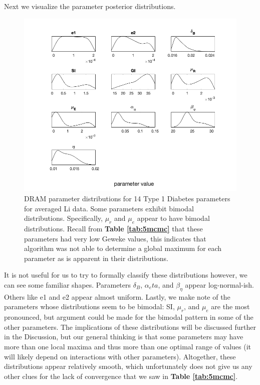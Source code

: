 \documentclass{article}
\begin{document}
\par Next we visualize the parameter posterior distributions.
\begin{figure}[H]
    \centering
    \includegraphics[width=15cm]{MCMC_figs/dram_t1d_final/jul10_avg_run1(noIC)_acute_NOD_waveOn_lietal_den.png}
    \caption{DRAM parameter distributions for 14 Type 1 Diabetes parameters for averaged Li data. Some parameters exhibit bimodal distributions. Specifically, $\mu_r$ and $\mu_e$ appear to have bimodal distributions. Recall from \textbf{Table \ref{tab:5mcmc}} that these parameters had very low Geweke values, this indicates that algorithm was not able to determine a global maximum for each parameter as is apparent in their distributions.}
    \label{fig:15mcmc}
\end{figure}
It is not useful for us to try to formally classify these distributions however, we can see some familiar shapes. Parameters $\delta_B$, $\alpha_eta$, and $\beta_{\eta}$ appear log-normal-ish. Others like e1 and e2 appear almost uniform. Lastly, we make note of the parameters whose distributions seem to be bimodal: SI, $\mu_r$, and $\mu_e$ are the most pronounced, but argument could be made for the bimodal pattern in some of the other parameters. The implications of these distributions will be discussed further in the Discussion, but our general thinking is that some parameters may have more than one local maxima and thus more than one optimal range of values (it will likely depend on interactions with other parameters). Altogether, these distributions appear relatively smooth, which unfortunately does not give us any other clues for the lack of convergence that we saw in \textbf{Table \ref{tab:5mcmc}}.
\end{document}
